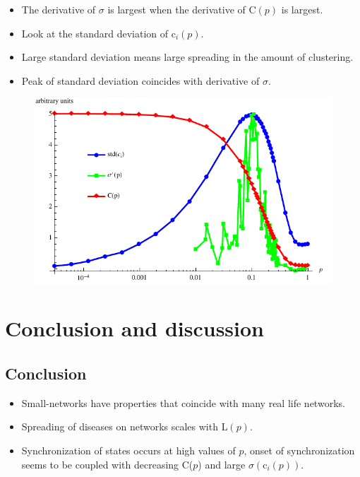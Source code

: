 \documentclass[blackandwhite]{beamer}
\begin{document}
\begin{frame}
	\begin{itemize}
	\item
	The derivative of $\sigma$ is largest when the derivative of C$(p)$ is largest.
	\item
	Look at the standard deviation of c$_{i}(p)$.
	\item
	Large standard deviation means large spreading in the amount of clustering.
	\item
	Peak of standard deviation coincides with derivative of $\sigma$.
	\end{itemize} 
	\begin{center}
	\begin{figure}
	\includegraphics[scale=0.5]{std.pdf}
	\end{figure}
	\end{center}
\end{frame}

\section{Conclusion and discussion}

\subsection{Conclusion}

\begin{frame}
	\begin{itemize}
	\item
	Small-networks have properties that coincide with many real life networks.
	\item
	Spreading of diseases on networks scales with L$(p)$.
	\item
	Synchronization of states occurs at high values of $p$, onset of synchronization seems to be coupled with decreasing C($p$) and large $\sigma(\text{c}_{i}(p))$.
	\end{itemize}
\end{frame}
\end{document}
